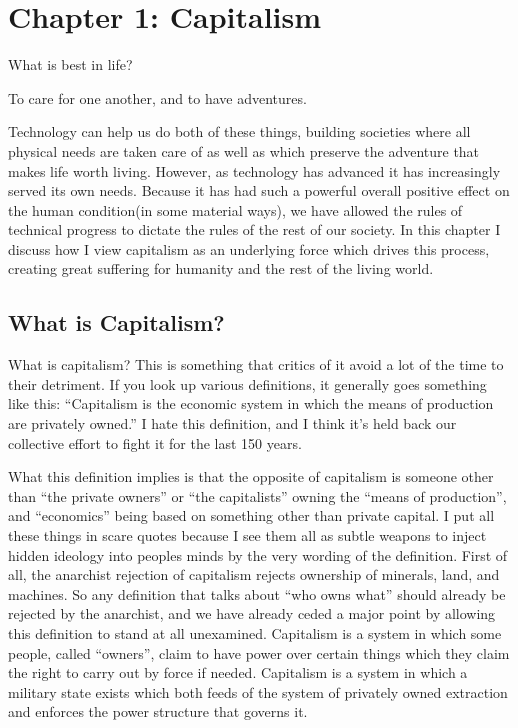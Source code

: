 \section{Chapter 1: Capitalism}\label{chapter-1-capitalism}

What is best in life?

To care for one another, and to have adventures.

Technology can help us do both of these things, building societies where
all physical needs are taken care of as well as which preserve the
adventure that makes life worth living. However, as technology has
advanced it has increasingly served its own needs. Because it has had
such a powerful overall positive effect on the human condition(in some
material ways), we have allowed the rules of technical progress to
dictate the rules of the rest of our society. In this chapter I discuss
how I view capitalism as an underlying force which drives this process,
creating great suffering for humanity and the rest of the living world.

\subsection{What is Capitalism?}\label{what-is-capitalism}

What is capitalism? This is something that critics of it avoid a lot of
the time to their detriment. If you look up various definitions, it
generally goes something like this: ``Capitalism is the economic system
in which the means of production are privately owned.'' I hate this
definition, and I think it's held back our collective effort to fight it
for the last 150 years.

What this definition implies is that the opposite of capitalism is
someone other than ``the private owners'' or ``the capitalists'' owning
the ``means of production'', and ``economics'' being based on something
other than private capital. I put all these things in scare quotes
because I see them all as subtle weapons to inject hidden ideology into
peoples minds by the very wording of the definition. First of all, the
anarchist rejection of capitalism rejects ownership of minerals, land,
and machines. So any definition that talks about ``who owns what''
should already be rejected by the anarchist, and we have already ceded a
major point by allowing this definition to stand at all unexamined.
Capitalism is a system in which some people, called ``owners'', claim to
have power over certain things which they claim the right to carry out
by force if needed. Capitalism is a system in which a military state
exists which both feeds of the system of privately owned extraction and
enforces the power structure that governs it.


